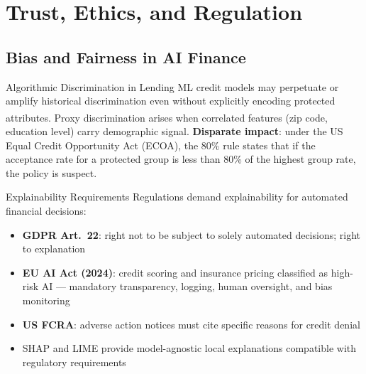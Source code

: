 \section{Trust, Ethics, and Regulation}

\subsection{Bias and Fairness in AI Finance}


\begin{v3topic}{Algorithmic Discrimination in Lending}
    ML credit models may perpetuate or amplify historical discrimination even without explicitly encoding protected attributes\textsuperscript{\cite[][p.~716]{jansenMachineLearningAlgorithmic2020}}.
    Proxy discrimination arises when correlated features (zip code, education level) carry demographic signal.
    \textbf{Disparate impact}: under the US Equal Credit Opportunity Act (ECOA), the 80\% rule states that if the acceptance rate for a protected group is less than 80\% of the highest group rate, the policy is suspect.

\end{v3topic}
\begin{v3topic}{Explainability Requirements}
    Regulations demand explainability for automated financial decisions:
\visualseparator
    \begin{itemize}
        \item \textbf{GDPR Art.~22}: right not to be subject to solely automated decisions; right to explanation
        \item \textbf{EU AI Act (2024)}: credit scoring and insurance pricing classified as high-risk AI — mandatory transparency, logging, human oversight, and bias monitoring
        \item \textbf{US FCRA}: adverse action notices must cite specific reasons for credit denial
        \item SHAP and LIME provide model-agnostic local explanations compatible with regulatory requirements
    \end{itemize}

\end{v3topic}

